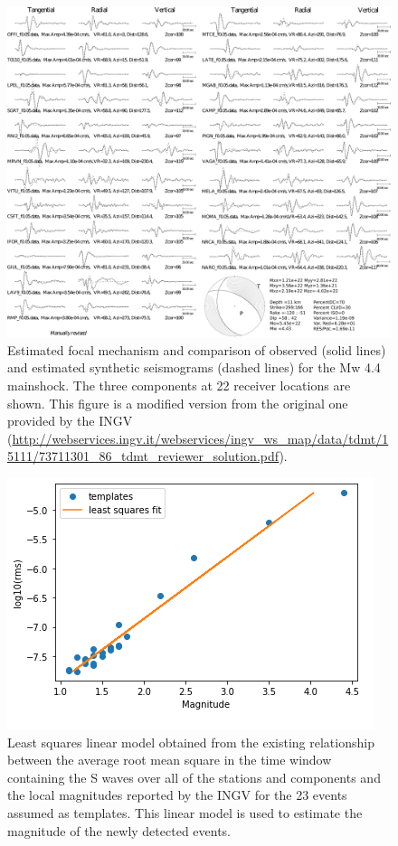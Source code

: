 \documentclass[a4paper,12pt]{article}
\begin{document}
\begin{figure}
\renewcommand{\thefigure}{S\arabic{figure}}
\begin{center}
 \noindent \includegraphics[width=1\linewidth]{S2_Focal_synthetics} 
\end{center}
\caption{Estimated focal mechanism and comparison of observed (solid lines) and estimated synthetic seismograms (dashed lines) for the Mw 4.4 mainshock. The three components at 22 receiver locations are shown. This figure is a modified version from the original one provided by the INGV (\url{http://webservices.ingv.it/webservices/ingv_ws_map/data/tdmt/15111/73711301_86_tdmt_reviewer_solution.pdf}).}\label{fig:S2_focal_mechanism}
\end{figure}


\begin{figure}[!h]
\renewcommand{\thefigure}{S\arabic{figure}}
\begin{center}
 \includegraphics[width=0.8\linewidth]{S5_lsq_model.png} 
\end{center}
\caption{Least squares linear model obtained from the existing relationship between the average root mean square in the time window containing the S waves over all of the stations and components and the local magnitudes reported by the INGV for the 23 events assumed as templates. This linear model is used to estimate the magnitude of the newly detected events.}
\label{fig:S5_lsq_model}
\end{figure}
\end{document}
